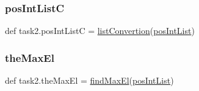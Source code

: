 \subsubsection{\texorpdfstring{pos\+Int\+ListC}{posIntListC}}
{\footnotesize\ttfamily def task2.\+pos\+Int\+ListC = \hyperlink{namespacetask2_af2d3e8cd162d9d507993819e98d611ee}{list\+Convertion}(\hyperlink{namespacetask2_ae07ebbc4c73946fcc787d1c29614fb12}{pos\+Int\+List})}

\mbox{\label{namespacetask2_a0aa5c0e9a96dd2230879efc62effa19a}} 
\subsubsection{\texorpdfstring{the\+Max\+El}{theMaxEl}}
{\footnotesize\ttfamily def task2.\+the\+Max\+El = \hyperlink{namespacetask2_ab1e91c5a3a92f52a8577e1992a218e0e}{find\+Max\+El}(\hyperlink{namespacetask2_ae07ebbc4c73946fcc787d1c29614fb12}{pos\+Int\+List})}

